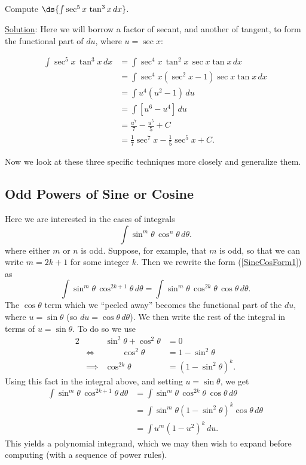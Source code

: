 \bex Compute $\ds{\int\sec^5x\,\tan^3x\,dx}$.

\underline{Solution}: Here we will borrow a factor of secant,
and another of tangent, to form the functional part of $du$,
where $u=\sec x$:

\begin{align*}
\int\sec^5x\,\tan^3x\,dx&=\int\sec^4x\,\tan^2x\,\sec x\tan x\,dx\\
&=\int\sec^4x\left(\sec^2x-1\right)\sec x\tan x\,dx\\
&=\int u^4\left(u^2-1\right)\,du\\
&=\int\left[u^6-u^4\right]\,du\\
&=\frac{u^7}7-\frac{u^5}5+C\\
&=\frac17\sec^7x-\frac15\sec^5x+C.
\end{align*}
\eex

Now we look at these three specific techniques more closely
and generalize them.

\subsection{Odd Powers of Sine or Cosine\label{OddSineOrCosine}}
Here we are interested in the cases of integrals
\begin{equation}\int\sin^m\theta\,\cos^n\theta\,d\theta.\label{SineCosForm1}
\end{equation}
where either $m$ or $n$ is odd.  Suppose, for example, that
$m$ is odd, so that we can write $m=2k+1$ for some integer $k$.
Then we rewrite the form (\ref{SineCosForm1}) as 
$$\int\sin^m\theta\,\cos^{2k+1}\theta\,d\theta
  =\int\sin^m\theta\,\cos^{2k}\theta\,\cos\theta\,d\theta.$$
The $\cos\theta$ term which we ``peeled away'' becomes the functional
part of the $du$, where $u=\sin\theta$ (so $du=\cos\theta\,d\theta$).
We then write the rest of the integral in terms of $u=\sin\theta$.
To do so we use
\begin{alignat*}{2}
&&\sin^2\theta+\cos^2\theta&=0\\
&\iff&\qquad\cos^2\theta&=1-\sin^2\theta\\
&\implies&\cos^{2k}\theta&=\left(1-\sin^2\theta\right)^k.\end{alignat*}
Using this fact in the integral above, and setting $u=\sin\theta$, we get
\begin{align*}
\int\sin^m\theta\,\cos^{2k+1}\theta\,d\theta
 & =\int\sin^m\theta\,\cos^{2k}\theta\,\cos\theta\,d\theta\\
 &=\int\sin^m\theta\left(1-\sin^2\theta\right)^k\cos\theta\,d\theta\\
 &=\int u^m\left(1-u^2\right)^k\,du.\end{align*}
This yields a polynomial integrand, which
we may then wish to expand before computing (with a sequence of power
rules).

